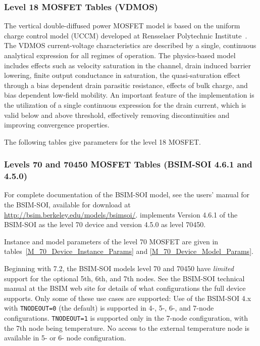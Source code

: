 \subsubsection{Level 18 MOSFET Tables (VDMOS)}
The vertical double-diffused power MOSFET model is based on the uniform charge
control model (UCCM) developed at Rensselaer Polytechnic Institute~\cite{Fjeldly:1998}.
The VDMOS current-voltage characteristics are described by a single, continuous
analytical expression for all regimes of operation.  The physics-based model
includes effects such as velocity saturation in the channel, drain induced barrier
lowering, finite output conductance in saturation, the quasi-saturation effect
through a bias dependent drain parasitic resistance, effects of bulk charge, and
bias dependent low-field mobility.  An important feature of the implementation
is the utilization of a single continuous expression for the drain current, which
is valid below and above threshold, effectively removing discontinuities and
improving convergence properties.

The following tables give parameters for the level 18 MOSFET.




\clearpage
\subsubsection{Levels 70 and 70450 MOSFET Tables (BSIM-SOI 4.6.1 and 4.5.0)}
For complete documentation of the BSIM-SOI model, see the users'
manual for the BSIM-SOI, available for download at
\url{http://bsim.berkeley.edu/models/bsimsoi/}.  \Xyce{} implements
Version 4.6.1 of the BSIM-SOI as the level 70 device and version 4.5.0
as level 70450.

Instance and model parameters of the level 70 MOSFET are given in
tables~\ref{M_70_Device_Instance_Params} and
\ref{M_70_Device_Model_Params}.

Beginning with \Xyce{} 7.2, the BSIM-SOI models level 70 and 70450
have {\em limited} support for the optional 5th, 6th, and 7th nodes.
See the BSIM-SOI technical manual at the BSIM web site for details of
what configurations the full device supports.  Only some of these use
cases are supported: Use of the BSIM-SOI 4.x with \texttt{TNODEOUT=0}
(the default) is supported in 4-, 5-, 6-, and 7-node configurations.
\texttt{TNODEOUT=1} is supported only in the 7-node configuration,
with the 7th node being temperature.  No access to the external
temperature node is available in 5- or 6- node configuration.

